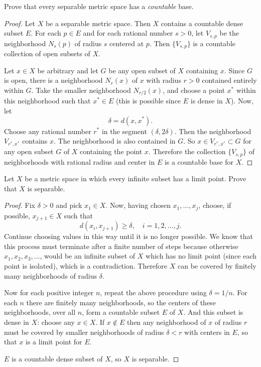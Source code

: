 Prove that every separable metric space has a {\em countable} base.
\label{exercise-separable-metric-space-has-countable-base}
\begin{proof}
  Let $X$ be a separable metric space. Then $X$ contains a countable
  dense subset $E$. For each $p\in E$ and for each rational number
  $s > 0$, let $V_{s,p}$ be the neighborhood $N_s(p)$ of radius $s$
  centered at $p$. Then $\{V_{s,p}\}$ is a countable collection of
  open subsets of $X$.

  Let $x\in X$ be arbitrary and let $G$ be any open subset of $X$
  containing $x$. Since $G$ is open, there is a neighborhood $N_r(x)$
  of $x$ with radius $r > 0$ contained entirely within $G$. Take the
  smaller neighborhood $N_{r/2}(x)$, and choose a point $x^*$ within
  this neighborhood such that $x^*\in E$ (this is possible since $E$
  is dense in $X$). Now, let
  \begin{equation*}
    \delta = d(x,x^*).
  \end{equation*}
  Choose any rational number $r^*$ in the segment
  $(\delta,2\delta)$. Then the neighborhood $V_{r^*,x^*}$ contains
  $x$. The neighborhood is also contained in $G$. So
  $x\in V_{r^*,x^*}\subset G$ for any open subset $G$ of $X$
  containing the point $x$. Therefore the collection $\{V_{s,p}\}$ of
  neighborhoods with rational radius and center in $E$ is a countable
  base for $X$.
\end{proof}

 Let $X$ be a metric space in which every infinite subset
has a limit point. Prove that $X$ is separable.
\label{exercise-infinite-subsets-have-limit-points-implies-separable}
\begin{proof}
  Fix $\delta>0$ and pick $x_1\in X$. Now, having chosen
  $x_1,\dots,x_j$, choose, if possible, $x_{j+1}\in X$ such that
  \begin{equation*}
    d(x_i, x_{j+1})\geq\delta, \quad i = 1, 2, \dots, j.
  \end{equation*}
  Continue choosing values in this way until it is no longer
  possible. We know that this process must terminate after a finite
  number of steps because otherwise $x_1, x_2, x_3, \dots$, would be
  an infinite subset of $X$ which has no limit point (since each point
  is isolated), which is a contradiction. Therefore $X$ can be covered
  by finitely many neighborhoods of radius $\delta$.

  Now for each positive integer $n$, repeat the above procedure using
  $\delta = 1/n$. For each $n$ there are finitely many neighborhoods,
  so the centers of these neighborhoods, over all $n$, form a
  countable subset $E$ of $X$. And this subset is dense in $X$: choose
  any $x\in X$. If $x\not\in E$ then any neighborhood of $x$ of radius
  $r$ must be covered by smaller neighborhoods of radius $\delta < r$
  with centers in $E$, so that $x$ is a limit point for $E$.

  $E$ is a countable dense subset of $X$, so $X$ is separable.
\end{proof}

